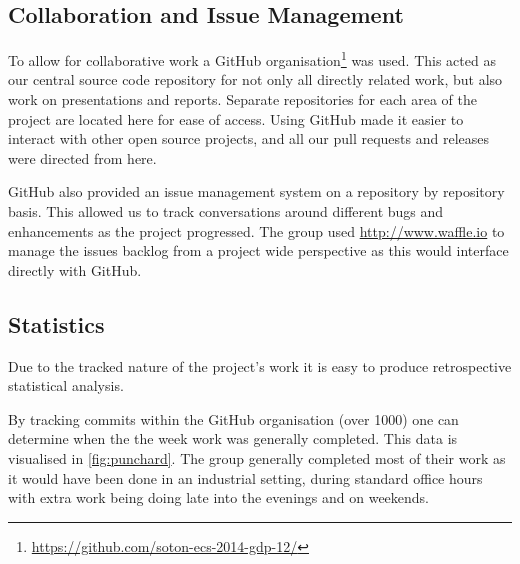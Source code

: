 \subsection{Collaboration and Issue Management}
To allow for collaborative work a GitHub organisation\footnote{\url{https://github.com/soton-ecs-2014-gdp-12/}} was used. This acted as our central source code repository for not only all directly related work, but also work on presentations and reports. Separate repositories for each area of the project are located here for ease of access. Using GitHub made it easier to interact with other open source projects, and all our pull requests and releases were directed from here. 

GitHub also provided an issue management system on a repository by repository basis. This allowed us to track conversations around different bugs and enhancements as the project progressed.
The group used \url{http://www.waffle.io} to manage the issues backlog from a project wide perspective as this would interface directly with GitHub.

\subsection{Statistics}

Due to the tracked nature of the project's work it is easy to produce retrospective statistical analysis.

By tracking commits within the GitHub organisation (over 1000) one can determine when the the week work was generally completed. This data is visualised in \autoref{fig:punchard}. The group generally completed most of their work as it would have been done in an industrial setting, during standard office hours with extra work being doing late into the evenings and on weekends.

